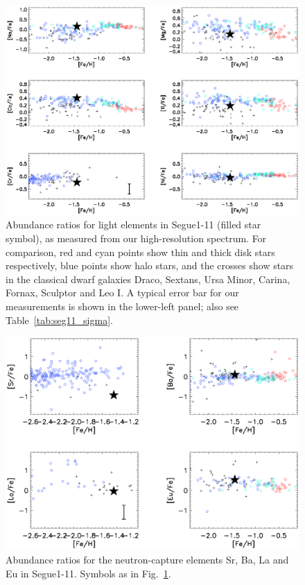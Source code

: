 \documentclass{emulateapj}
\begin{document}
\begin{figure}
 \begin{center}
  \includegraphics{light_el.ps}
  \caption{Abundance ratios for light elements in Segue1-11 (filled star symbol), as measured from our high-resolution spectrum. For comparison, red and cyan points show thin and thick disk stars respectively, blue points show halo stars, and the crosses show stars in the classical dwarf galaxies Draco, Sextans, Ursa Minor, Carina, Fornax, Sculptor and Leo I. A typical error bar for our measurements is shown in the lower-left panel; also see Table~\ref{tab:seg11_sigma}. }
  \label{fig:light_el}
 \end{center}
\end{figure} 


\begin{figure}
 \begin{center}
  \includegraphics{nc_el.ps}
  \caption{Abundance ratios for the neutron-capture elements Sr, Ba, La and Eu in Segue1-11. Symbols as in Fig.~\ref{fig:light_el}.}
  \label{fig:nc_el}
 \end{center}
\end{figure} 
\end{document}
